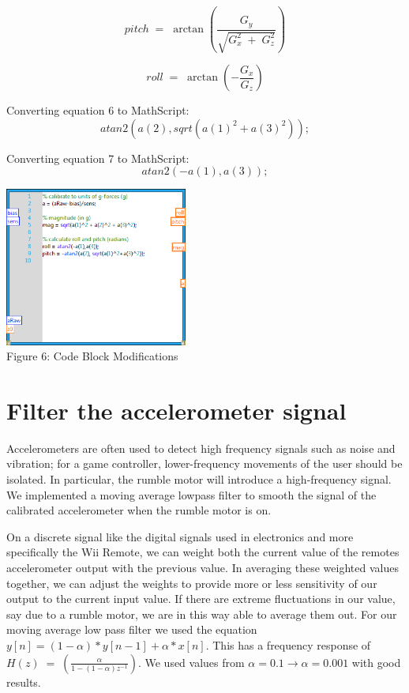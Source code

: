 \documentclass[twoside]{article}
\begin{document}
\begin{multicols}{2}
\begin{equation}pitch \; = \;\arctan \left( \frac{G_{y}}{\sqrt{G_{x}^{2}\; +\; G_{z}^{2}}} \right)
\end{equation}

\begin{equation}roll \; = \;  \arctan \left( -\frac{G_{x}}{G_{z}} \right)
\end{equation}

Converting equation 6 to MathScript:
\begin{equation}atan2(a(2), sqrt(a(1)^2+a(3)^2));
\end{equation}

Converting equation 7 to MathScript:
\begin{equation}atan2(-a(1),a(3));
\end{equation}

\begin{center}
\includegraphics*[width = 6cm]{FIG6.png}\\
Figure 6: Code Block Modifications
\end{center}


\section{Filter the accelerometer signal}

Accelerometers are often used to detect high frequency signals such as noise and vibration; for a game controller, lower-frequency movements of the user should be isolated. In particular, the rumble motor will introduce a high-frequency signal. We implemented a moving average lowpass filter to smooth the signal of the calibrated accelerometer when the rumble motor is on. 

\noindent On a discrete signal like the digital signals used in electronics and more specifically the Wii Remote, we can weight both the current value of the remotes accelerometer output with the previous value. In averaging these weighted values together, we can adjust the weights to provide more or less sensitivity of our output to the current input value. If there are extreme fluctuations in our value, say due to  a rumble motor, we are in this way able to average them out. For our moving average low pass filter we used the equation $ y[n] = (1 - \alpha)*y[n-1] + \alpha*x[n] $. This has a frequency response of $ H(z) \; = \; \left( \frac{\alpha}{1-(1-\alpha)z^{-1}}  \right) $. We used values from $\alpha = 0.1 \rightarrow \alpha = 0.001$ with good results.


\end{multicols}
\end{document}
